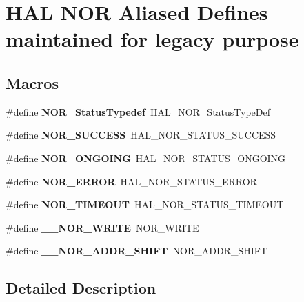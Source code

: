 \hypertarget{group___h_a_l___n_o_r___aliased___defines}{}\section{H\+AL N\+OR Aliased Defines maintained for legacy purpose}
\label{group___h_a_l___n_o_r___aliased___defines}
\subsection*{Macros}
\begin{DoxyCompactItemize}
\item 
\mbox{\label{group___h_a_l___n_o_r___aliased___defines_ga279519672efdd52720bbf3b701c03286}} 
\#define {\bfseries N\+O\+R\+\_\+\+Status\+Typedef}~H\+A\+L\+\_\+\+N\+O\+R\+\_\+\+Status\+Type\+Def
\item 
\mbox{\label{group___h_a_l___n_o_r___aliased___defines_ga5f4df82c08207d51443ddd3516510578}} 
\#define {\bfseries N\+O\+R\+\_\+\+S\+U\+C\+C\+E\+SS}~H\+A\+L\+\_\+\+N\+O\+R\+\_\+\+S\+T\+A\+T\+U\+S\+\_\+\+S\+U\+C\+C\+E\+SS
\item 
\mbox{\label{group___h_a_l___n_o_r___aliased___defines_gac80642cc21e52c08c95cad9bbb1bfe7a}} 
\#define {\bfseries N\+O\+R\+\_\+\+O\+N\+G\+O\+I\+NG}~H\+A\+L\+\_\+\+N\+O\+R\+\_\+\+S\+T\+A\+T\+U\+S\+\_\+\+O\+N\+G\+O\+I\+NG
\item 
\mbox{\label{group___h_a_l___n_o_r___aliased___defines_gab9f3025f50c2dcddae291485261981b0}} 
\#define {\bfseries N\+O\+R\+\_\+\+E\+R\+R\+OR}~H\+A\+L\+\_\+\+N\+O\+R\+\_\+\+S\+T\+A\+T\+U\+S\+\_\+\+E\+R\+R\+OR
\item 
\mbox{\label{group___h_a_l___n_o_r___aliased___defines_ga3b0bf7d05266f4dfb03d8dcb2093ab07}} 
\#define {\bfseries N\+O\+R\+\_\+\+T\+I\+M\+E\+O\+UT}~H\+A\+L\+\_\+\+N\+O\+R\+\_\+\+S\+T\+A\+T\+U\+S\+\_\+\+T\+I\+M\+E\+O\+UT
\item 
\mbox{\label{group___h_a_l___n_o_r___aliased___defines_ga7b65a23e48189016e4f22ba4b84773ad}} 
\#define {\bfseries \+\_\+\+\_\+\+N\+O\+R\+\_\+\+W\+R\+I\+TE}~N\+O\+R\+\_\+\+W\+R\+I\+TE
\item 
\mbox{\label{group___h_a_l___n_o_r___aliased___defines_ga0fbcfd18de611ae4687a6bc41f427249}} 
\#define {\bfseries \+\_\+\+\_\+\+N\+O\+R\+\_\+\+A\+D\+D\+R\+\_\+\+S\+H\+I\+FT}~N\+O\+R\+\_\+\+A\+D\+D\+R\+\_\+\+S\+H\+I\+FT
\end{DoxyCompactItemize}


\subsection{Detailed Description}
